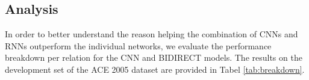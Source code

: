 \documentclass[11pt,letterpaper]{article}
\begin{document}
\begin{table}[htbp]
\small
\centering
{}
\caption{Performance of Relation Classification Systems. The \dag refers to special treatment to the  class.}
\label{tab:rc}
\end{table}


\subsection{Analysis}





In order to better understand the reason helping the combination of CNNs and RNNs outperform the individual networks, we evaluate the performance breakdown per relation for the CNN and BIDIRECT models. The results on the development set of the ACE 2005 dataset are provided in Tabel \ref{tab:breakdown}. 
\end{document}
